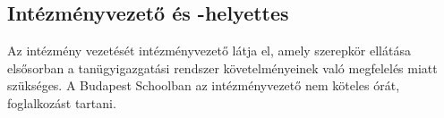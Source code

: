 
\hypertarget{intezmenyvezeto-es--helyettes}{%
\subsection{Intézményvezető és
-helyettes}\label{intezmenyvezeto-es--helyettes}}

Az intézmény vezetését intézményvezető látja el, amely szerepkör
ellátása elsősorban a tanügyigazgatási rendszer követelményeinek való
megfelelés miatt szükséges. A Budapest Schoolban az intézményvezető nem
köteles órát, foglalkozást tartani.

